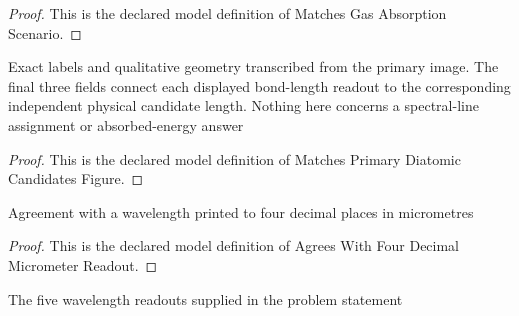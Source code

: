 \begin{proof}
  This is the declared model definition of Matches Gas Absorption Scenario.
\end{proof}
\begin{definition}
  \label{def:physics:phyx-mini-0631:phyxminiproblems-problemphyxmini0631-matchesprimarydiatomiccandidatesfigure}
  Exact labels and qualitative geometry transcribed from the primary image. The final three fields connect each displayed bond-length readout to the corresponding independent physical candidate length. Nothing here concerns a spectral-line assignment or absorbed-energy answer
\end{definition}
\begin{proof}
  This is the declared model definition of Matches Primary Diatomic Candidates Figure.
\end{proof}
\begin{definition}
  \label{def:physics:phyx-mini-0631:phyxminiproblems-problemphyxmini0631-agreeswithfourdecimalmicrometerreadout}
  Agreement with a wavelength printed to four decimal places in micrometres
\end{definition}
\begin{proof}
  This is the declared model definition of Agrees With Four Decimal Micrometer Readout.
\end{proof}
\begin{definition}
  \label{def:physics:phyx-mini-0631:phyxminiproblems-problemphyxmini0631-matchesgivenabsorptionwavelengths}
  The five wavelength readouts supplied in the problem statement
\end{definition}
